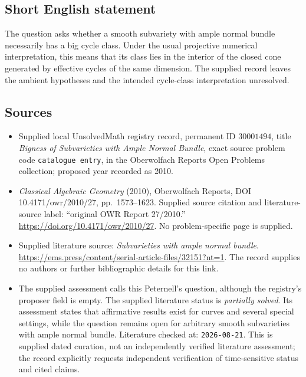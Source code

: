 \documentclass[11pt]{article}
\begin{document}
\subsection{Short English statement}
The question asks whether a smooth subvariety with ample normal bundle necessarily has a big cycle class. Under the usual projective numerical interpretation, this means that its class lies in the interior of the closed cone generated by effective cycles of the same dimension. The supplied record leaves the ambient hypotheses and the intended cycle-class interpretation unresolved.
\subsection{Sources}
\begin{itemize}
\item Supplied local UnsolvedMath registry record, permanent ID \(30001494\), title \emph{Bigness of Subvarieties with Ample Normal Bundle}, exact source problem code \texttt{catalogue entry}, in the Oberwolfach Reports Open Problems collection; proposed year recorded as 2010.
\item \emph{Classical Algebraic Geometry} (2010), Oberwolfach Reports, DOI 10.4171/owr/2010/27, pp.\ 1573--1623. Supplied source citation and literature-source label: ``original OWR Report 27/2010.'' \url{https://doi.org/10.4171/owr/2010/27}. No problem-specific page is supplied.
\item Supplied literature source: \emph{Subvarieties with ample normal bundle}. \url{https://ems.press/content/serial-article-files/32151?nt=1}. The record supplies no authors or further bibliographic details for this link.
\item The supplied assessment calls this Peternell's question, although the registry's proposer field is empty. The supplied literature status is \emph{partially solved}. Its assessment states that affirmative results exist for curves and several special settings, while the question remains open for arbitrary smooth subvarieties with ample normal bundle. Literature checked at: \texttt{2026-08-21}. This is supplied dated curation, not an independently verified literature assessment; the record explicitly requests independent verification of time-sensitive status and cited claims.
\end{itemize}
\end{document}
